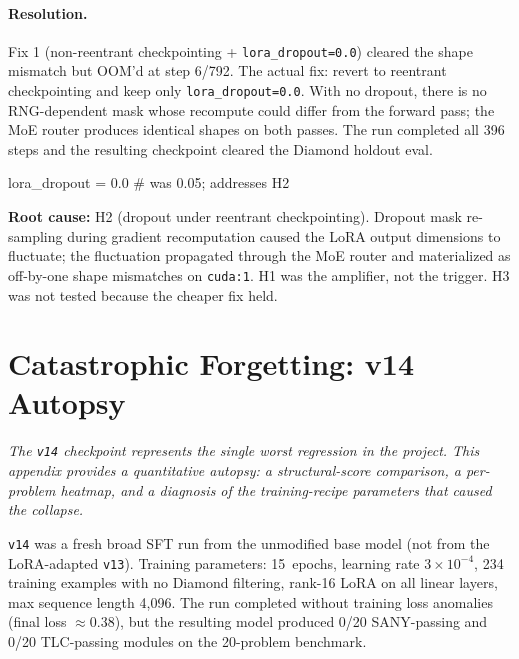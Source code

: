 \documentclass[11pt]{article}
\begin{document}
\paragraph{Resolution.}
Fix 1 (non-reentrant checkpointing + \texttt{lora\_dropout=0.0})
cleared the shape mismatch but OOM'd at step 6/792.  The actual fix:
revert to reentrant checkpointing and keep only
\texttt{lora\_dropout=0.0}.  With no dropout, there is no
RNG-dependent mask whose recompute could differ from the forward pass;
the MoE router produces identical shapes on both passes.  The run
completed all 396 steps and the resulting checkpoint cleared the
Diamond holdout eval.

\begin{tcolorbox}[
  enhanced, colback=cbox, colframe=cline, boxrule=0.5pt,
  arc=2pt, left=6pt, right=6pt, top=3pt, bottom=3pt,
  fontupper=\ttfamily\scriptsize,
  title=\textbf{One-line fix}, fonttitle=\small\rmfamily,
]
lora\_dropout = 0.0 \quad\# was 0.05; addresses H2
\end{tcolorbox}

\noindent \textbf{Root cause:}  H2 (dropout under reentrant
checkpointing).  Dropout mask re-sampling during gradient recomputation
caused the LoRA output dimensions to fluctuate; the fluctuation
propagated through the MoE router and materialized as off-by-one shape
mismatches on \texttt{cuda:1}.  H1 was the amplifier, not the trigger.
H3 was not tested because the cheaper fix held.

\section{Catastrophic Forgetting: v14 Autopsy}
\label{app:v14-autopsy}

\noindent\textit{The \texttt{v14} checkpoint represents the single worst
regression in the project.  This appendix provides a quantitative
autopsy: a structural-score comparison, a per-problem heatmap, and a
diagnosis of the training-recipe parameters that caused the collapse.}

\medskip
\texttt{v14} was a fresh broad SFT run from the unmodified base model
(not from the LoRA-adapted \texttt{v13}).  Training parameters:
15~epochs, learning rate $3 \times 10^{-4}$, 234 training examples with
no Diamond filtering, rank-16 LoRA on all linear layers, max sequence
length 4{,}096.  The run completed without training loss anomalies (final
loss $\approx 0.38$), but the resulting model produced 0/20 SANY-passing
and 0/20 TLC-passing modules on the 20-problem benchmark.
\end{document}
